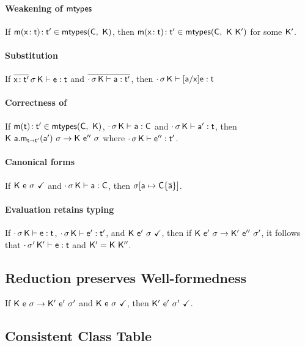\documentclass[acmlarge, anonymous, authordraft]{acmart}
\begin{document}
\paragraph{Weakening of ${\sf{mtypes}}$}

If $\Mtype\m{\HT\x\t}\tp \in \classoff{\C}{\K}$, then $\Mtype\m{\HT\x\t}\tp \in \classoff{\C}{\K~\Kp}$ for some ${{\sf{K'}}}$.

\paragraph{Substitution}

If $\EnvType{\b{\HT\x\tp}}\s\K\e\t$ and $\b{\EnvType\cdot\s\K\a\tp}$, then $\EnvType\cdot\s\K{[\a/\x]\e}\t$

\paragraph{Correctness of \classoff{\C}{\K}}

If $\Mtype\m{\t}\tp \in \classoff{\C}{\K}$, $\cdot\,\sigma\,{\sf{K}}\vdash {\sf{a}} : {\sf{C}}$ and 
$\EnvType\cdot\s\K\ap\t$, then $\Reduce \K{\KCall\a\m{\ap}{\t}{\tp}}\s \K\epp\s$ where $\EnvType\cdot\s\K\epp\tp$. 

\paragraph{Canonical forms}

If ${\sf{K}}~{\sf{e}}~\sigma~\checkmark$ and $\cdot\,\sigma\,{\sf{K}}\vdash {\sf{a}} : {\sf{C}}$, then $\sigma[{\sf{a}}\mapsto{ \ensuremath{ {\sf{C}}\{\overline{{\sf{a}}}\}}}]$.

\paragraph{Evaluation retains typing} \label{lem:ert}

If $\EnvType\cdot\s\K\e\t$, $\EnvType\cdot\s\K\ep\tp$, and ${\sf{K}}~{{{\sf{e'}}}}~\sigma~\checkmark$, then if ${{\sf{K}}}~{{{{\sf{e'}}}}}~{\sigma} \rightarrow {{\ensuremath{{\sf{K'}}}}}~{{{{\sf{e''}}}}}~{{{\sigma'}}}$, it follows that $\EnvType\cdot\sp\Kp\e\t$ and ${{\sf{K'}}} = {\sf{K}}~{{\sf{K''}}}$.

\subsection{Reduction preserves Well-formedness}

If ${{\sf{K}}}~{{\sf{e}}}~{\sigma} \rightarrow {{\ensuremath{{\sf{K'}}}}}~{{{{\sf{e'}}}}}~{{{\sigma'}}}$ and ${\sf{K}}~{\sf{e}}~\sigma~\checkmark$, then ${{\sf{K'}}}~{{{\sf{e'}}}}~{{\sigma'}}~\checkmark$. 

\subsection{Consistent Class Table}
\end{document}
